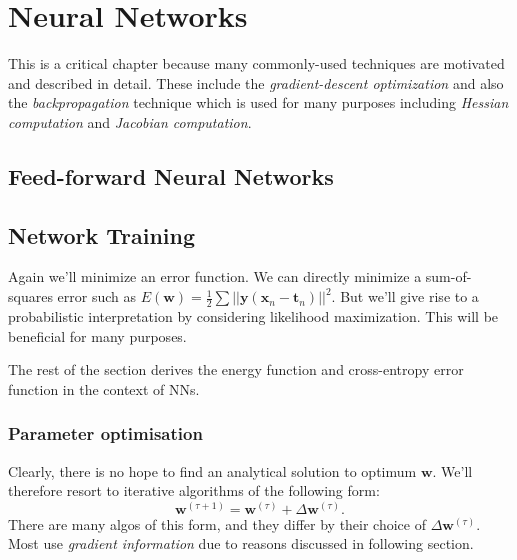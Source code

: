 \documentclass[a4paper]{article}
\newcommand{\mb}{\mathbf}
\begin{document}
\section{Neural Networks}
This is a critical chapter because many commonly-used techniques are motivated and described in detail. These include the \textit{gradient-descent optimization} and also the \textit{backpropagation} technique which is used for many purposes including \textit{Hessian computation} and \textit{Jacobian computation}. 

\subsection{Feed-forward Neural Networks}
\subsection{Network Training}
Again we'll minimize an error function. We can directly minimize a sum-of-squares error such as $E(\mb{w}) = \frac{1}{2}\sum||\mb{y}(\mb{x}_n-\mb{t}_n)||^2$. But we'll give rise to a probabilistic interpretation by considering likelihood maximization. This will be beneficial for many purposes.

The rest of the section derives the energy function and cross-entropy error function in the context of NNs.

\subsubsection{Parameter optimisation}
Clearly, there is no hope to find an analytical solution to optimum $\mb{w}$. We'll therefore resort to iterative algorithms of the following form:
%
\begin{equation}
\mb{w}^{(\tau+1)}=\mb{w}^{(\tau)}+\Delta \mb{w}^{(\tau)}.
\end{equation}
%
There are many algos of this form, and they differ by their choice of $\Delta\mb{w}^{(\tau)}$. Most use \textit{gradient information} due to reasons discussed in following section.
\end{document}
